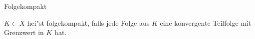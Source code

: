 \documentclass[class=article, crop=false]{standalone}
\begin{document}
\begin{zettel}{Folgekompakt}
\begin{flashcard}
    \begin{definition}[folgekompakt]
        $K \subset  X$ hei"st folgekompakt, falls jede Folge aus $K$ eine konvergente Teilfolge mit Grenzwert in $K$ hat.
    \end{definition}
\end{flashcard}
\end{zettel}
\end{document}
